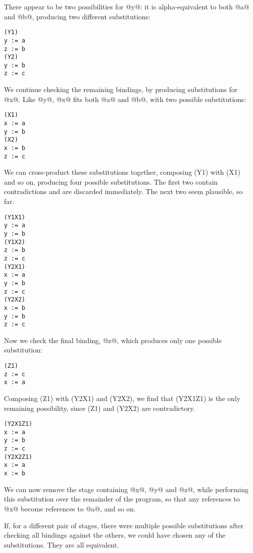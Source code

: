 There appear to be two possibilities for @y@: it is alpha-equivalent to both @a@ and @b@, producing two different substitutions:
\begin{lstlisting}
(Y1)
y := a
z := b
(Y2)
y := b
z := c
\end{lstlisting}

We continue checking the remaining bindings, by producing substitutions for @x@.
Like @y@, @x@ fits both @a@ and @b@, with two possible substitutions:
\begin{lstlisting}
(X1)
x := a
y := b
(X2)
x := b
z := c
\end{lstlisting}

We can cross-product these substitutions together, composing (Y1) with (X1) and so on, producing four possible substitutions.
The first two contain contradictions and are discarded immediately.
The next two seem plausible, so far.
\begin{lstlisting}
(Y1X1)
y := a
y := b
(Y1X2)
z := b
z := c
(Y2X1)
x := a
y := b
z := c
(Y2X2)
x := b
y := b
z := c
\end{lstlisting}

Now we check the final binding, @z@, which produces only one possible substitution:
\begin{lstlisting}
(Z1)
z := c
x := a
\end{lstlisting}

Composing (Z1) with (Y2X1) and (Y2X2), we find that (Y2X1Z1) is the only remaining possibility, since (Z1) and (Y2X2) are contradictory.
\begin{lstlisting}
(Y2X1Z1)
x := a
y := b
z := c
(Y2X2Z1)
x := a
x := b
\end{lstlisting}

We can now remove the stage containing @x@, @y@ and @z@, while performing this substitution over the remainder of the program, so that any references to @x@ become references to @a@, and so on.

If, for a different pair of stages, there were multiple possible substitutions after checking all bindings against the others, we could have chosen any of the substitutions.
They are all equivalent.



